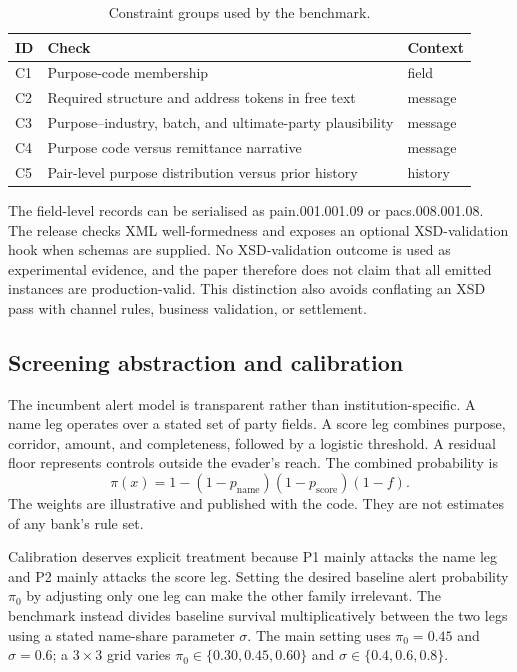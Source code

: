 \documentclass[conference]{IEEEtran}
\begin{document}
\begin{table}[!t]
\caption{Constraint groups used by the benchmark.}
\label{tab:constraints}
\centering
\scriptsize
\begin{tabularx}{\columnwidth}{@{}lXl@{}}
\toprule
ID & Check & Context \\
\midrule
C1 & Purpose-code membership & field \\
C2 & Required structure and address tokens in free text & message \\
C3 & Purpose--industry, batch, and ultimate-party plausibility & message \\
C4 & Purpose code versus remittance narrative & message \\
C5 & Pair-level purpose distribution versus prior history & history \\
\bottomrule
\end{tabularx}
\end{table}

The field-level records can be serialised as pain.001.001.09 or
pacs.008.001.08. The release checks XML well-formedness and exposes an optional
XSD-validation hook when schemas are supplied. No XSD-validation outcome is
used as experimental evidence, and the paper therefore does not claim that all
emitted instances are production-valid. This distinction also avoids
conflating an XSD pass with channel rules, business validation, or settlement.

\subsection{Screening abstraction and calibration}
The incumbent alert model is transparent rather than institution-specific. A
name leg operates over a stated set of party fields. A score leg combines
purpose, corridor, amount, and completeness, followed by a logistic threshold.
A residual floor represents controls outside the evader's reach. The combined
probability is
\begin{equation}
 \pi(x)=1-(1-p_{\mathrm{name}})(1-p_{\mathrm{score}})(1-f).
 \label{eq:screening}
\end{equation}
The weights are illustrative and published with the code. They are not
estimates of any bank's rule set.

Calibration deserves explicit treatment because P1 mainly attacks the name
leg and P2 mainly attacks the score leg. Setting the desired baseline alert
probability $\pi_0$ by adjusting only one leg can make the other family
irrelevant. The benchmark instead divides baseline survival multiplicatively
between the two legs using a stated name-share parameter $\sigma$. The main
setting uses $\pi_0=0.45$ and $\sigma=0.6$; a $3\times3$ grid varies
$\pi_0\in\{0.30,0.45,0.60\}$ and $\sigma\in\{0.4,0.6,0.8\}$.
\end{document}
